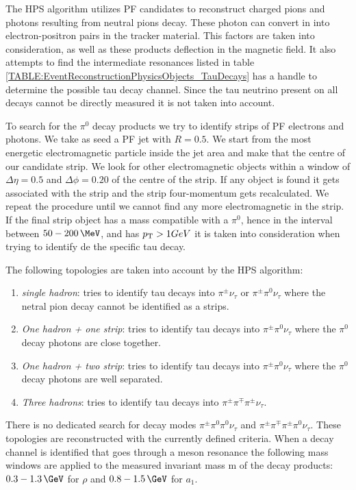 
The \gls{HPS} algorithm utilizes \gls{PF} candidates to reconstruct charged pions and photons resulting from neutral pions decay. These photon can convert in into electron-positron pairs in the tracker material. This factors are taken into consideration, as well as these products deflection in the magnetic field. It also attempts to find the intermediate resonances listed in table \ref{TABLE:EventReconstructionPhysicsObjects_TauDecays} has a handle to determine the possible tau decay channel. Since the tau neutrino present on all decays cannot be directly measured it is not taken into account.

To search for the $\pi^{0}$ decay products we try to identify strips of \gls{PF} electrons and photons. We take as seed a \gls{PF} jet with $R = 0.5$. We start from the most energetic electromagnetic particle inside the jet area and make that the centre of our candidate strip. We look for other electromagnetic objects within a window of $\Delta\eta = 0.5$ and $\Delta\phi = 0.20$ of the centre of the strip. If any object is found it gets associated with the strip and the strip four-momentum gets recalculated. We repeat the procedure until we cannot find any more electromagnetic in the strip. If the final strip object has a mass compatible with a $\pi^{0}$, hence in the interval between $50-200\,\MeV$, and has $p_{\mathrm{T}} > 1 GeV$ it is taken into consideration when trying to identify de the specific tau decay.

The following topologies are taken into account by the \gls{HPS} algorithm:

\begin{enumerate}
  \item \textit{single hadron}: tries to identify tau decays into $\pi^{\pm} \nu_\tau$ or $\pi^{\pm} \pi^{0} \nu_\tau$ where the netral pion decay cannot be identified as a strips.
  \item \textit{One hadron + one strip}: tries to identify tau decays into $\pi^{\pm} \pi^{0} \nu_\tau$ where the $\pi^{0}$ decay photons are close together. 
  \item \textit{One hadron + two strip}: tries to identify tau decays into $\pi^{\pm} \pi^{0} \nu_\tau$ where the $\pi^{0}$ decay photons are well separated.
  \item \textit{Three hadrons}: tries to identify tau decays into $\pi^{\pm} \pi^{\mp} \pi^{\pm} \nu_\tau$.
\end{enumerate}

There is no dedicated search for decay modes $\pi^{\pm} \pi^{0} \pi^{0} \nu_\tau$ and $\pi^{\pm} \pi^{\mp} \pi^{\pm} \pi^{0} \nu_\tau$. These topologies are reconstructed with the currently defined criteria. When a decay channel is identified that goes through a meson resonance the following mass windows are applied to the measured invariant mass m of the decay products: $0.3-1.3\,\GeV$ for $\rho$ and $0.8-1.5\,\GeV$ for $a_{1}$.

